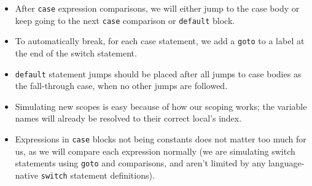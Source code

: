 \documentclass[11pt]{article}
\begin{document}
\begin{itemize}[noitemsep]
\item After \texttt{case} expression comparisons, we will either jump
  to the case body or keep going to the next \texttt{case} comparison
  or \texttt{default} block.
\item To automatically break, for each case statement, we add a
  \texttt{goto} to a label at the end of the switch statement.
\item \texttt{default} statement jumps should be placed after all
  jumps to case bodies as the fall-through case, when no other jumps
  are followed.
\item Simulating new scopes is easy because of how our scoping works;
  the variable names will already be resolved to their correct local's
  index.
\item Expressions in \texttt{case} blocks not being constants does not
  matter too much for us, as we will compare each expression normally
  (we are simulating switch statements using \texttt{goto} and
  comparisons, and aren't limited by any language-native
  \texttt{switch} statement definitions).
\end{itemize}
\end{document}

